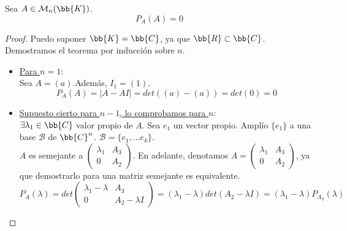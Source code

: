 \begin{teo} 

Sea $A\in\mathcal{M}_n(\bb{K})$. \begin{equation*}
    P_A(A) = 0
\end{equation*}
\end{teo}

\begin{proof}
    Puedo suponer $\bb{K}=\bb{C}$, ya que $\bb{R} \subset \bb{C}$. Demostramos el teorema por inducción sobre $n$.

    \begin{itemize}
        \item \underline{Para $n=1$}:\\
        Sea $A=(a)$.Además, $I_1 = (1)$.
        \begin{equation*}
            P_A(A) = |A-AI| = det((a)-(a)) = det(0) = 0
        \end{equation*}

        \item \underline{Supuesto cierto para $n-1$, lo comprobamos para $n$}:\\
        $\exists \lambda_1\in \bb{C}$ valor propio de $A$. Sea $e_1$ un vector propio.
        Amplío $\{e_1\}$ a una base $\mathcal{B}$ de $\bb{C}^n$. $\mathcal{B} = \{e_1, \dots e_k\}$.\\
        $A$ es semejante a $\left(\begin{array}{c|c}
            \lambda_1 & A_3 \\ \hline
            0 & A_2
        \end{array}\right)$. En adelante, denotamos $A=\left(\begin{array}{c|c}
            \lambda_1 & A_3 \\ \hline
            0 & A_2
        \end{array}\right)$, ya que demostrarlo para una matriz semejante es equivalente.
        \begin{equation*}
            P_{A}(\lambda) = det\left(\begin{array}{c|c}
                \lambda_1 - \lambda & A_3 \\ \hline
                0 & A_2 - \lambda I
            \end{array}\right) = (\lambda_1 - \lambda) det(A_2 - \lambda I) = (\lambda_1 - \lambda)P_{A_2}(\lambda)
        \end{equation*}


\end{itemize}
\end{proof}
